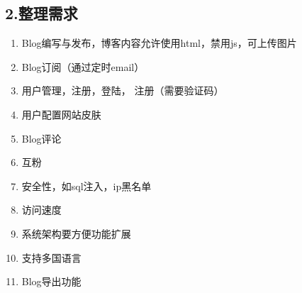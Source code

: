 \documentclass[a4paper,oneside,12pt]{book}
\newenvironment{SChinese}{
  \CJKfamily{gkai}
  \CJKtilde
  \CJKnospace}{}
\begin{document}
\begin{CJK*}{UTF8}{kai}
\begin{SChinese}
\begin{flushleft}
\section*{2.整理需求}
\begin{enumerate}
\item{ Blog编写与发布，博客内容允许使用html，禁用js，可上传图片}
\item{ Blog订阅（通过定时email）}
\item{ 用户管理，注册，登陆， 注册（需要验证码）}
\item{ 用户配置网站皮肤}
\item{ Blog评论}
\item{ 互粉}
\item{ 安全性，如sql注入，ip黑名单}
\item{ 访问速度}
\item{ 系统架构要方便功能扩展}
\item{ 支持多国语言}
\item{ Blog导出功能}
\end{enumerate}
\end{flushleft}
\end{SChinese}
\end{CJK*}
\end{document}
